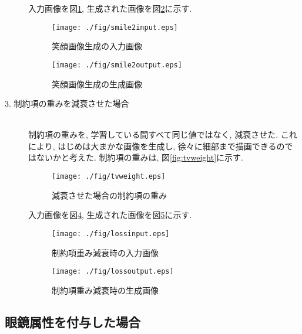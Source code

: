 \begin{description}
入力画像を図\ref{fig:smile2input}, 生成された画像を図\ref{fig:smile2output}に示す. 

\begin{figure}[H]
 	\begin{center}
 		\texttt{[image: ./fig/smile2input.eps]}
 		\caption{笑顔画像生成の入力画像}
 		\label{fig:smile2input}
 	\end{center}
\end{figure}
\begin{figure}[H]
 	\begin{center}
 		\texttt{[image: ./fig/smile2output.eps]}
 		\caption{笑顔画像生成の生成画像}
 		\label{fig:smile2output}
 	\end{center}
\end{figure}

 \item[3. 制約項の重みを減衰させた場合]\mbox{}\\
制約項の重みを, 学習している間すべて同じ値ではなく, 減衰させた. これにより, はじめは大まかな画像を生成し, 徐々に細部まで描画できるのではないかと考えた. 制約項の重みは, 図\ref{fig:tvweight}に示す. 
\begin{figure}[H]
 	\begin{center}
 		\texttt{[image: ./fig/tvweight.eps]}
 		\caption{減衰させた場合の制約項の重み}
 		\label{fig:tvweght}
 	\end{center}
 \end{figure}
 
入力画像を図\ref{fig:lossinput}, 生成された画像を図\ref{fig:lossoutput}に示す. 

\begin{figure}[H]
 	\begin{center}
 		\texttt{[image: ./fig/lossinput.eps]}
 		\caption{制約項重み減衰時の入力画像}
 		\label{fig:lossinput}
 	\end{center}
\end{figure}
\begin{figure}[H]
 	\begin{center}
 		\texttt{[image: ./fig/lossoutput.eps]}
 		\caption{制約項重み減衰時の生成画像}
 		\label{fig:lossoutput}
 	\end{center}
\end{figure}
 
\end{description}

\subsection{眼鏡属性を付与した場合}

